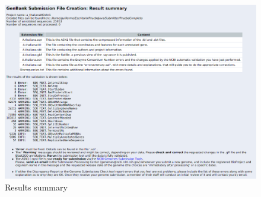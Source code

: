\begin{figure}[!ht] \centering
\includegraphics[width=\textwidth]{img/SummaryResults.png}
\caption{Results summary}
\label{fig:ncbisubtool}
\end{figure}

\newpage
